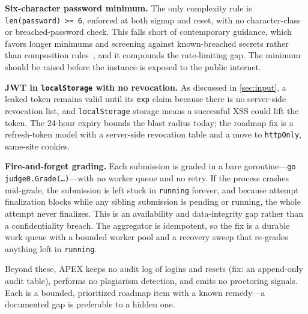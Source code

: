 \textbf{Six-character password minimum.} The only complexity rule is
\texttt{len(password)\ >=\ 6}, enforced at both signup and reset, with no
character-class or breached-password check. This falls short of contemporary
guidance, which favors longer minimums and screening against known-breached
secrets rather than composition rules~\cite{nist80063b}, and it compounds the
rate-limiting gap. The minimum should be raised before the instance is exposed to
the public internet.

\textbf{JWT in \texttt{localStorage} with no revocation.} As discussed in
\cref{sec:input}, a leaked token remains valid until its \texttt{exp} claim
because there is no server-side revocation list, and \texttt{localStorage}
storage means a successful XSS could lift the token. The 24-hour expiry bounds
the blast radius today; the roadmap fix is a refresh-token model with a
server-side revocation table and a move to \texttt{httpOnly}, same-site cookies.

\textbf{Fire-and-forget grading.} Each submission is graded in a bare
goroutine---\texttt{go judge0.Grade(\dots)}---with no worker queue and no retry.
If the process crashes mid-grade, the submission is left stuck in \texttt{running}
forever, and because attempt finalization blocks while any sibling submission is
pending or running, the whole attempt never finalizes. This is an
availability and data-integrity gap rather than a confidentiality breach. The
aggregator is idempotent, so the fix is a durable work queue with a bounded
worker pool and a recovery sweep that re-grades anything left in \texttt{running}.

Beyond these, APEX keeps no audit log of logins and resets (fix: an append-only
audit table), performs no plagiarism detection, and emits no proctoring signals.
Each is a bounded, prioritized roadmap item with a known remedy---a documented
gap is preferable to a hidden one.
